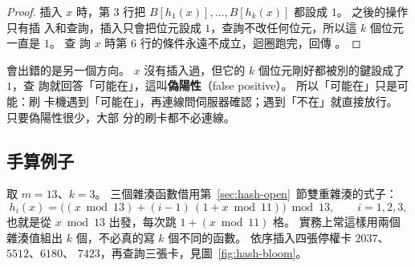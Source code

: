 \begin{proof}
插入 $x$ 時，第 $3$ 行把 $B[h_1(x)], \ldots, B[h_k(x)]$ 都設成 $1$。 之後的操作只有插
入和查詢，插入只會把位元設成 $1$，查詢不改任何位元，所以這 $k$ 個位元一直是 $1$。 查
詢 $x$ 時第 $6$ 行的條件永遠不成立，迴圈跑完，回傳 \TRUE。
\end{proof}

會出錯的是另一個方向。 $x$ 沒有插入過，但它的 $k$ 個位元剛好都被別的鍵設成了 $1$，查
詢就回答「可能在」，這叫\textbf{偽陽性}（false positive）。 所以「可能在」只是可能：刷
卡機遇到「可能在」，再連線問伺服器確認；遇到「不在」就直接放行。 只要偽陽性很少，大部
分的刷卡都不必連線。

\subsection{手算例子}
\label{sec:hash-bloom-trace}

取 $m = 13$、$k = 3$。 三個雜湊函數借用第~\ref{sec:hash-open}~節雙重雜湊的式子：
\[
h_i(x) = \bigl( (x \bmod 13) + (i - 1)\,(1 + x \bmod 11) \bigr) \bmod 13, \qquad i = 1, 2, 3,
\]
也就是從 $x \bmod 13$ 出發，每次跳 $1 + (x \bmod 11)$ 格。 實務上常這樣用兩個雜湊值組出
$k$ 個，不必真的寫 $k$ 個不同的函數。 依序插入四張停權卡 $2037$、$5512$、$6180$、
$7423$，再查詢三張卡，見圖~\ref{fig:hash-bloom}。

